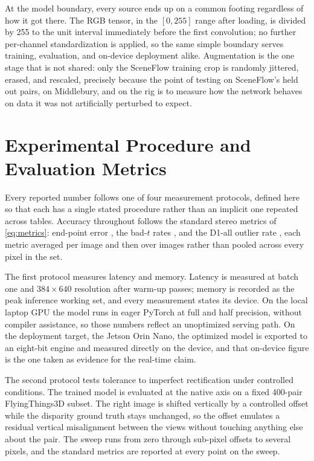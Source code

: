 At the model boundary, every source ends up on a common footing
regardless of how it got there. The RGB tensor, in the $[0,255]$ range
after loading, is divided by 255 to the unit interval immediately before
the first convolution; no further per-channel standardization is
applied, so the same simple boundary serves training, evaluation, and
on-device deployment alike. Augmentation is the one stage that is not
shared: only the SceneFlow training crop is randomly jittered, erased,
and rescaled, precisely because the point of testing on SceneFlow's held
out pairs, on Middlebury, and on the rig is to measure how the network
behaves on data it was not artificially perturbed to expect.

\FloatBarrier
\section{Experimental Procedure and Evaluation Metrics}
\label{sec:testing_protocols}
Every reported number follows one of four measurement protocols,
defined here so that each has a single stated procedure rather than an
implicit one repeated across tables. Accuracy
throughout follows the standard stereo metrics of \eqref{eq:metrics}:
end-point error \cite{mayer2016sceneflow}, the bad-$t$ rates
\cite{scharstein2002taxonomy}, and the D1-all outlier rate
\cite{menze2015kitti}, each metric averaged per image and then over
images rather than pooled across every pixel in the set.

The first protocol measures latency and memory. Latency is measured at
batch one and $384\times 640$ resolution after warm-up passes; memory is
recorded as the peak inference working set, and every measurement states
its device. On the local laptop GPU the model runs in eager PyTorch at
full and half precision, without compiler assistance, so those numbers
reflect an unoptimized serving path. On the deployment target, the
Jetson Orin Nano, the optimized model is exported to an eight-bit engine
and measured directly on the device, and that on-device figure is the
one taken as evidence for the real-time claim.

The second protocol tests tolerance to imperfect rectification under
controlled conditions. The trained model is evaluated at the native axis
on a fixed 400-pair FlyingThings3D subset. The right image is shifted
vertically by a controlled offset while the disparity ground truth stays
unchanged, so the offset emulates a residual vertical misalignment
between the views without touching anything else about the pair. The
sweep runs from zero through sub-pixel offsets to several pixels, and
the standard metrics are reported at every point on the sweep.

